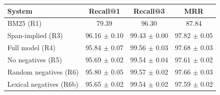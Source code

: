 \begin{tabular}{lccc}
\hline
System & Recall@1 & Recall@3 & MRR \\
\hline
BM25 (R1) & 79.39 & 96.30 & 87.84 \\
Span-implied (R3) & 96.16 $\pm$ 0.10 & 99.43 $\pm$ 0.00 & 97.82 $\pm$ 0.05 \\
Full model (R4) & 95.84 $\pm$ 0.07 & 99.56 $\pm$ 0.03 & 97.68 $\pm$ 0.03 \\
No negatives (R5) & 95.69 $\pm$ 0.02 & 99.54 $\pm$ 0.04 & 97.61 $\pm$ 0.02 \\
Random negatives (R6) & 95.80 $\pm$ 0.05 & 99.57 $\pm$ 0.02 & 97.66 $\pm$ 0.03 \\
Lexical negatives (R6b) & 95.65 $\pm$ 0.02 & 99.54 $\pm$ 0.02 & 97.59 $\pm$ 0.02 \\
\hline
\end{tabular}
